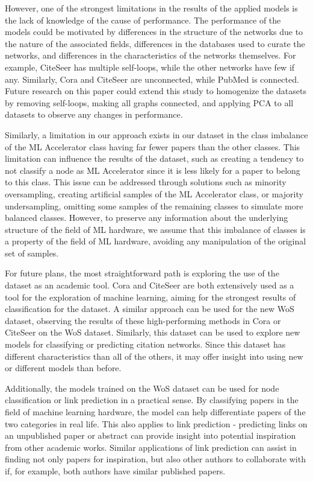 \documentclass[conference]{IEEEtran}
\begin{document}
However, one of the strongest limitations in the results of the applied models 
is the lack of knowledge of the cause of performance. The performance of the 
models could be motivated by differences in the structure of the networks due 
to the nature of the associated fields, differences in the databases used to 
curate the networks, and differences in the characteristics of the networks 
themselves. For example, CiteSeer has multiple self-loops, while the other 
networks have few if any. Similarly, Cora and CiteSeer are unconnected, while 
PubMed is connected. Future research on this paper could extend this study to 
homogenize the datasets by removing self-loops, making all graphs connected, 
and applying PCA to all datasets to observe any changes in performance. \par 

Similarly, a limitation in our approach exists in our dataset in the class 
imbalance of the ML Accelerator class having far fewer papers than the other 
classes. This limitation can influence the results of the dataset, such as 
creating a tendency to not classify a node as ML Accelerator since it is 
less likely for a paper to belong to this class. This issue can be addressed 
through solutions such as minority oversampling, creating artificial samples 
of the ML Accelerator class, or majority undersampling, omitting some samples 
of the remaining classes to simulate more balanced classes. However, to 
preserve any information about the underlying structure of the field of 
ML hardware, we assume that this imbalance of classes is a property of 
the field of ML hardware, avoiding any manipulation of the original 
set of samples. \par

For future plans, the most straightforward path is exploring the use of the 
dataset as an academic tool. Cora and CiteSeer are both extensively used as a 
tool for the exploration of machine learning, aiming for the strongest results 
of classification for the dataset. A similar approach can be used for the new 
WoS dataset, observing the results of these high-performing methods in Cora 
or CiteSeer on the WoS dataset. Similarly, this dataset can be used to explore 
new models for classifying or predicting citation networks. Since this dataset 
has different characteristics than all of the others, it may offer insight 
into using new or different models than before. \par

Additionally, the models trained on the WoS dataset can be used for node 
classification or link prediction in a practical sense. By classifying 
papers in the field of machine learning hardware, the model can help 
differentiate papers of the two categories in real life. This also 
applies to link prediction - predicting links on an unpublished paper or 
abstract can provide insight into potential inspiration from other academic 
works. Similar applications of link prediction can assist in finding not only 
papers for inspiration, but also other authors to collaborate with if, 
for example, both authors have similar published papers. \par
\end{document}
